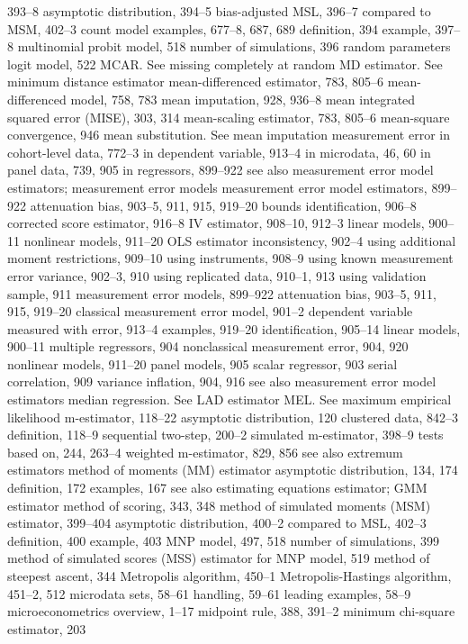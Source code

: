 393–8
asymptotic distribution, 394–5 bias-adjusted MSL, 396–7
compared to MSM, 402–3
count model examples, 677–8, 687, 689 definition, 394
example, 397–8
multinomial probit model, 518
number of simulations, 396
random parameters logit model, 522
MCAR. See missing completely at random
MD estimator. See minimum distance estimator mean-differenced estimator, 783, 805–6 mean-differenced model, 758, 783
mean imputation, 928, 936–8
mean integrated squared error (MISE), 303, 314 mean-scaling estimator, 783, 805–6 mean-square convergence, 946
mean substitution. See mean imputation measurement error
in cohort-level data, 772–3
in dependent variable, 913–4
in microdata, 46, 60
in panel data, 739, 905
in regressors, 899–922
see also measurement error model estimators;
measurement error models
measurement error model estimators, 899–922 attenuation bias, 903–5, 911, 915, 919–20 bounds identification, 906–8
corrected score estimator, 916–8
IV estimator, 908–10, 912–3
linear models, 900–11
nonlinear models, 911–20
OLS estimator inconsistency, 902–4
using additional moment restrictions, 909–10 using instruments, 908–9
using known measurement error variance, 902–3, 910
using replicated data, 910–1, 913
using validation sample, 911 measurement error models, 899–922
attenuation bias, 903–5, 911, 915, 919–20 classical measurement error model, 901–2 dependent variable measured with error, 913–4 examples, 919–20
identification, 905–14
linear models, 900–11
multiple regressors, 904
nonclassical measurement error, 904, 920 nonlinear models, 911–20
panel models, 905
scalar regressor, 903
serial correlation, 909
variance inflation, 904, 916
see also measurement error model estimators
median regression. See LAD estimator MEL. See maximum empirical likelihood m-estimator, 118–22
asymptotic distribution, 120 clustered data, 842–3 definition, 118–9
sequential two-step, 200–2 simulated m-estimator, 398–9 tests based on, 244, 263–4 weighted m-estimator, 829, 856 see also extremum estimators
method of moments (MM) estimator asymptotic distribution, 134, 174 definition, 172
examples, 167
see also estimating equations estimator; GMM estimator
method of scoring, 343, 348
method of simulated moments (MSM) estimator,
399–404
asymptotic distribution, 400–2 compared to MSL, 402–3 definition, 400
example, 403
MNP model, 497, 518
number of simulations, 399
method of simulated scores (MSS) estimator for MNP model, 519
method of steepest ascent, 344
Metropolis algorithm, 450–1 Metropolis-Hastings algorithm, 451–2, 512 microdata sets, 58–61
handling, 59–61
leading examples, 58–9 microeconometrics overview, 1–17 midpoint rule, 388, 391–2 minimum chi-square estimator, 203
